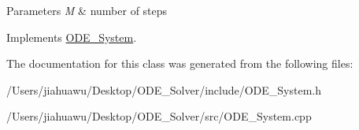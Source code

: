 \begin{DoxyParams}{Parameters}
{\em M} & number of steps \\
\hline
\end{DoxyParams}


Implements \mbox{\hyperlink{class_o_d_e___system_a78a058382148b745fa458f0b9f52f47c}{O\+D\+E\+\_\+\+System}}.



The documentation for this class was generated from the following files\+:\begin{DoxyCompactItemize}
\item 
/\+Users/jiahuawu/\+Desktop/\+O\+D\+E\+\_\+\+Solver/include/O\+D\+E\+\_\+\+System.\+h\item 
/\+Users/jiahuawu/\+Desktop/\+O\+D\+E\+\_\+\+Solver/src/O\+D\+E\+\_\+\+System.\+cpp\end{DoxyCompactItemize}
